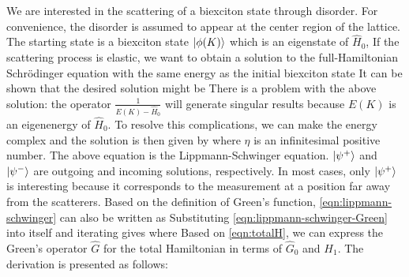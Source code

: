 We are interested in the scattering of a biexciton state through disorder. For convenience, the disorder is assumed
to appear at the center region of the lattice.  The starting state is a biexciton state $| \phi(K) \rangle$ which is an 
eigenstate of $\hat{H}_0$,
 If the scattering process is elastic, we want to obtain a solution to the
full-Hamiltonian Schr\"odinger equation with the same energy as the initial biexciton state
It can be shown that the desired solution might be
There is a problem with the above solution: the operator $\frac{1}{E(K) - \hat{H}_0}$ will generate singular results
because $E(K)$ is an eigenenergy of $\hat{H}_0$. To resolve this complications, we can make the energy 
complex and the solution is then given by
where $\eta$ is an infinitesimal positive number. 
The above equation is the Lippmann-Schwinger equation\cite{sakurai-book}. $| \psi^{+} \rangle$ and $| \psi^{-} \rangle$ are outgoing and
incoming solutions, respectively. In most cases, only $| \psi^{+} \rangle$ is interesting because it corresponds to the 
measurement at a position far away from the scatterers. Based on the definition of Green's function, 
\autoref{eqn:lippmann-schwinger} can also be written as 
Substituting \autoref{eqn:lippmann-schwinger-Green} into itself and iterating gives
where %
Based on \autoref{eqn:totalH}, we can express the Green's operator $\hat{G}$ for the total Hamiltonian in terms of
$\hat{G}_0$ and $H_1$. The derivation is presented as follows:

